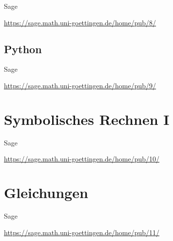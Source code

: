 \documentclass[hyperref={xetex}]{beamer}
\begin{document}
\begin{frame}[fragile]{Sage}
\begin{center}
\url{https://sage.math.uni-goettingen.de/home/pub/8/}
\end{center}
\end{frame}

\subsection{Python}
\begin{frame}[fragile]{Sage}
\begin{center}
\url{https://sage.math.uni-goettingen.de/home/pub/9/}
\end{center}
\end{frame}

\section{Symbolisches Rechnen I}
\begin{frame}[fragile]{Sage}
\begin{center}
\url{https://sage.math.uni-goettingen.de/home/pub/10/}
\end{center}
\end{frame}
\section{Gleichungen}
\begin{frame}[fragile]{Sage}
\begin{center}
\url{https://sage.math.uni-goettingen.de/home/pub/11/}
\end{center}
\end{frame}
\end{document}
